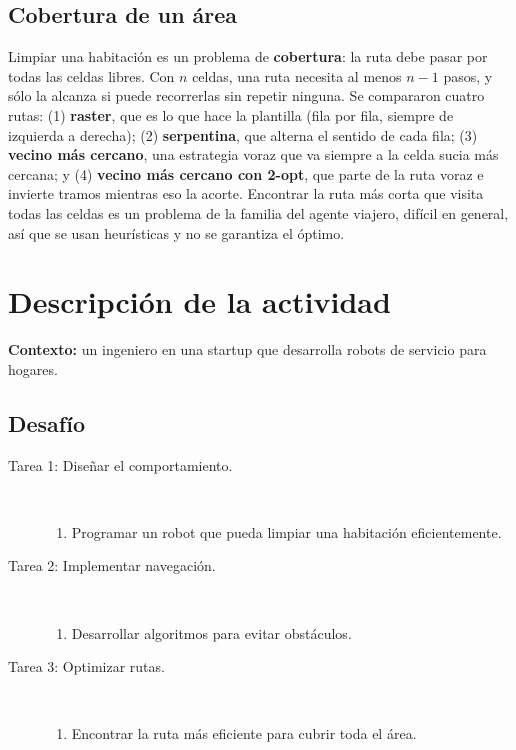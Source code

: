 \documentclass[11pt,letterpaper]{article}
\begin{document}
\subsection{Cobertura de un área}

Limpiar una habitación es un problema de \textbf{cobertura}: la ruta debe pasar por todas las celdas libres. Con $n$ celdas, una ruta necesita al menos $n - 1$ pasos, y sólo la alcanza si puede recorrerlas sin repetir ninguna. Se compararon cuatro rutas: (1) \textbf{raster}, que es lo que hace la plantilla (fila por fila, siempre de izquierda a derecha); (2) \textbf{serpentina}, que alterna el sentido de cada fila; (3) \textbf{vecino más cercano}, una estrategia voraz que va siempre a la celda sucia más cercana; y (4) \textbf{vecino más cercano con 2-opt}, que parte de la ruta voraz e invierte tramos mientras eso la acorte. Encontrar la ruta más corta que visita todas las celdas es un problema de la familia del agente viajero, difícil en general, así que se usan heurísticas y no se garantiza el óptimo.

\section{Descripción de la actividad}

\textbf{Contexto:} un ingeniero en una startup que desarrolla robots de servicio para hogares.

\subsection*{Desafío}

\begin{description}
    \item[Tarea 1: Diseñar el comportamiento.]\mbox{}\\[-1.3\baselineskip]
    \begin{enumerate}
        \item Programar un robot que pueda limpiar una habitación eficientemente.
    \end{enumerate}
    \item[Tarea 2: Implementar navegación.]\mbox{}\\[-1.3\baselineskip]
    \begin{enumerate}
        \item Desarrollar algoritmos para evitar obstáculos.
    \end{enumerate}
    \item[Tarea 3: Optimizar rutas.]\mbox{}\\[-1.3\baselineskip]
    \begin{enumerate}
        \item Encontrar la ruta más eficiente para cubrir toda el área.
    \end{enumerate}
\end{description}
\end{document}
